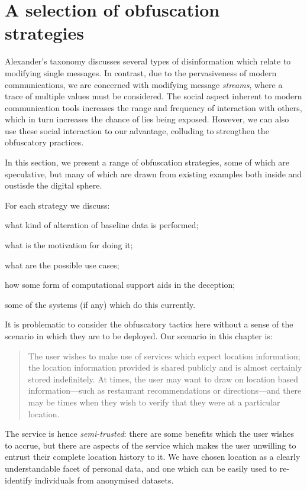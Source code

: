 \documentclass{IOS-Book-Article}     %
\begin{document}
\section{A selection of obfuscation strategies}
\label{sec:strategies}

Alexander's taxonomy \cite{alexander2010Disinformation} discusses several types
of disinformation which relate to modifying single messages. In contrast, due to
the pervasiveness of modern communications, we are concerned with modifying
message \emph{streams}, where a trace of multiple values must be considered.
The social aspect inherent to modern communication tools increases the 
range and frequency of interaction with others, which in turn increases the 
chance of lies being exposed.
However, we can also use these social interaction to our advantage, colluding to
strengthen the obfuscatory practices. %

In this section, we present a range of obfuscation strategies, some of which are
speculative, but many of which are drawn from existing examples both inside and
oustisde the digital sphere.

For each strategy we discuss: \begin{inparaenum}
\item what kind of alteration of baseline data is performed;
\item what is the motivation for doing it; 
\item what are the possible use cases;
\item how some form of computational support aids in the deception;
\item some of the systems (if any) which do this currently.
\end{inparaenum}

It is problematic to consider the obfuscatory tactics here without a sense of
the scenario in which they are to be deployed. Our scenario in this chapter is:
\begin{quote}
The user wishes to make use of services which expect location information; 
the location information provided is shared publicly and is almost
certainly stored indefinitely. At times, the user may want to draw on location
based information---such as restaurant recommendations or directions---and there
may be times when they wish to verify that they were at a particular location.
\end{quote}
The service is hence \emph{semi-trusted}: there are some benefits which the user
wishes to accrue, but there are aspects of the service which makes the user
unwilling to entrust their complete location history to it. We have chosen location
as a clearly understandable facet of personal data, and one which can be easily
used to re-identify individuals from anonymised
datasets\cite{montjoye2013Unique}.
\end{document}
